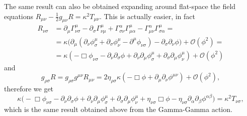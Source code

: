 \documentclass[a4paper,12pt]{book}
\begin{document}
The same result can also be obtained expanding around flat-space the field equations $R_{\mu\nu}-\frac12g_{\mu\nu}R=\kappa^2T_{\mu\nu}$. This is actually easier, in fact
\begin{align*}
R_{\nu\sigma}&=\partial_\mu\Gamma^\mu_{\nu\sigma}-\partial_\sigma\Gamma^\mu_{\nu\mu}+\Gamma^\alpha_{\sigma\nu}\Gamma^\mu_{\mu\alpha}-\Gamma^\alpha_{\mu\nu}\Gamma^\mu_{\sigma\alpha}=\\
&=\kappa\bigl(\partial_\mu(\partial_\nu\phi^\mu_\sigma+\partial_\sigma\phi^\mu_\nu-\partial^\mu\phi_{\nu\sigma})-\partial_\sigma\partial_\nu\phi\bigr)+\mathcal O(\phi^2)=\\
&=\kappa(-\Box\phi_{\nu\sigma}-\partial_\nu\partial_\sigma\phi+\partial_\nu\partial_\mu\phi^\mu_\sigma+\partial_\sigma\partial_\mu\phi^\mu_\nu)+\mathcal O(\phi^2)
\end{align*}
and
\[g_{\rho\sigma}R=g_{\rho\sigma}g^{\mu\nu}R_{\mu\nu}=2\eta_{\rho\sigma}\kappa(-\Box\phi+\partial_\mu\partial_\nu\phi^{\mu\nu})+\mathcal O(\phi^2),\]
therefore we get
\[\kappa\bigl(-\Box\phi_{\nu\sigma}-\partial_\nu\partial_\sigma\phi+\partial_\nu\partial_\mu\phi^\mu_\sigma+\partial_\sigma\partial_\mu\phi^\mu_\nu+\eta_{\nu\sigma}\Box\phi-\eta_{\nu\sigma}\partial_\alpha\partial_\beta\phi^{\alpha\beta}\bigr)=\kappa^2T_{\nu\sigma},\]
which is the same result obtained above from the Gamma-Gamma action.
\end{document}
